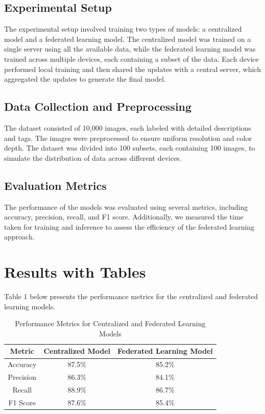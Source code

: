 \subsection{Experimental Setup}
The experimental setup involved training two types of models: a centralized model and a federated learning model. The centralized model was trained on a single server using all the available data, while the federated learning model was trained across multiple devices, each containing a subset of the data. Each device performed local training and then shared the updates with a central server, which aggregated the updates to generate the final model.

\subsection{Data Collection and Preprocessing}
The dataset consisted of 10,000 images, each labeled with detailed descriptions and tags. The images were preprocessed to ensure uniform resolution and color depth. The dataset was divided into 100 subsets, each containing 100 images, to simulate the distribution of data across different devices.

\subsection{Evaluation Metrics}
The performance of the models was evaluated using several metrics, including accuracy, precision, recall, and F1 score. Additionally, we measured the time taken for training and inference to assess the efficiency of the federated learning approach.

\section{Results with Tables}
Table 1 below presents the performance metrics for the centralized and federated learning models.

\begin{table}[ht]
\centering
\begin{tabular}{|c|c|c|}
\hline
\textbf{Metric} & \textbf{Centralized Model} & \textbf{Federated Learning Model} \\
\hline
Accuracy & 87.5\% & 85.2\% \\
Precision & 86.3\% & 84.1\% \\
Recall & 88.9\% & 86.7\% \\
F1 Score & 87.6\% & 85.4\% \\
\hline
\end{tabular}
\caption{Performance Metrics for Centralized and Federated Learning Models}
\label{tab:performance_metrics}
\end{table}


